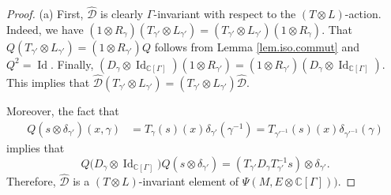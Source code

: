 \documentclass[11pt,a4paper]{amsart}
\newcommand{\C}{\mathbb C}
\newcommand{\maD}{\mathcal D}
\newcommand\<{\langle}
\renewcommand\>{\rangle}
\newcommand{\oid}{\operatorname{Id}}
\theoremstyle{definition}
\begin{document}
\begin{proof}
(a)  First, $\hat{\maD}$ is clearly $\Gamma$-invariant with respect to the $(T \otimes L)$-action. 
Indeed, we have 
$( 1 \otimes R_\gamma )( T_{\gamma'} \otimes L_{\gamma'} ) = ( T_{\gamma'} \otimes L_{\gamma'} ) ( 1 \otimes R_\gamma )$. That 
$Q( T_{\gamma'} \otimes L_{\gamma'} ) = (1 \otimes R_{\gamma'}) Q$ follows from  Lemma \ref{lem.iso.commut}  and $Q^2=\oid$. Finally, 
$(D_\gamma \otimes \oid_{\C[\Gamma]})(1 \otimes R_{\gamma'}) = (1 \otimes R_{\gamma'})(D_\gamma \otimes \oid_{\C[\Gamma]})$.
This implies that $\hat{\maD}(T_{\gamma'}\otimes L_{\gamma'}) =(T_{\gamma'}\otimes L_{\gamma'})\hat{\maD}$. 

Moreover,  the fact that				
\begin{align*}
Q(s \otimes \delta_{\gamma'})(x,\gamma) & = T_\gamma(s)(x) \delta_{\gamma'}(\gamma^{-1})= T_{\gamma'^{-1}}(s)(x)\delta_{\gamma'^{-1}}(\gamma)
\end{align*}
implies that 
\begin{equation}\label{QDIdQ}
Q\big(D_\gamma \otimes \oid_{\C[\Gamma]}\big) Q (s \otimes \delta_{\gamma'})
=(T_{\gamma'} D_\gamma T_{\gamma'}^{-1} s) \otimes \delta_{\gamma'}.
\end{equation}
Therefore, $\hat{\maD}$ is a $(T\otimes L)$-invariant element of $\Psi(M,E \otimes \C[\Gamma]))$.  %


\end{proof}
\end{document}
